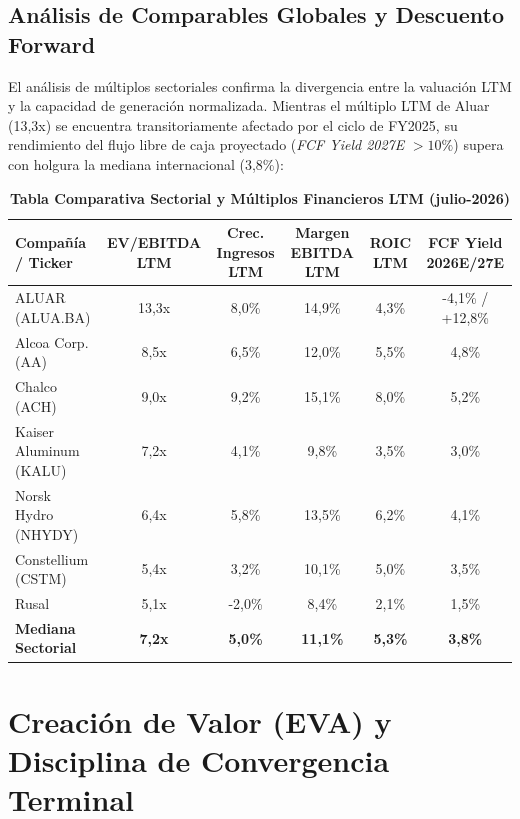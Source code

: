 \documentclass[10pt,a4paper]{article}
\begin{document}
\subsection{Análisis de Comparables Globales y Descuento Forward}
El análisis de múltiplos sectoriales confirma la divergencia entre la valuación LTM y la capacidad de generación normalizada. Mientras el múltiplo LTM de Aluar (13,3x) se encuentra transitoriamente afectado por el ciclo de FY2025, su rendimiento del flujo libre de caja proyectado (\textit{FCF Yield 2027E} $>10\%$) supera con holgura la mediana internacional (3,8\%):

\begin{table}[H]
\centering
\caption{\textbf{Tabla Comparativa Sectorial y Múltiplos Financieros LTM (julio-2026)}}
\scriptsize
\begin{tabularx}{\textwidth}{Xccccc}
\toprule
\textbf{Compañía / Ticker} & \textbf{EV/EBITDA LTM} & \textbf{Crec. Ingresos LTM} & \textbf{Margen EBITDA LTM} & \textbf{ROIC LTM} & \textbf{FCF Yield 2026E/27E} \\
\midrule
ALUAR (ALUA.BA) & 13,3x & 8,0\% & 14,9\% & 4,3\% & -4,1\% / +12,8\% \\
Alcoa Corp. (AA) & 8,5x & 6,5\% & 12,0\% & 5,5\% & 4,8\% \\
Chalco (ACH) & 9,0x & 9,2\% & 15,1\% & 8,0\% & 5,2\% \\
Kaiser Aluminum (KALU) & 7,2x & 4,1\% & 9,8\% & 3,5\% & 3,0\% \\
Norsk Hydro (NHYDY) & 6,4x & 5,8\% & 13,5\% & 6,2\% & 4,1\% \\
Constellium (CSTM) & 5,4x & 3,2\% & 10,1\% & 5,0\% & 3,5\% \\
Rusal & 5,1x & -2,0\% & 8,4\% & 2,1\% & 1,5\% \\
\midrule
\textbf{Mediana Sectorial} & \textbf{7,2x} & \textbf{5,0\%} & \textbf{11,1\%} & \textbf{5,3\%} & \textbf{3,8\%} \\
\bottomrule
\end{tabularx}
\end{table}

\section{Creación de Valor (EVA) y Disciplina de Convergencia Terminal}
\end{document}
